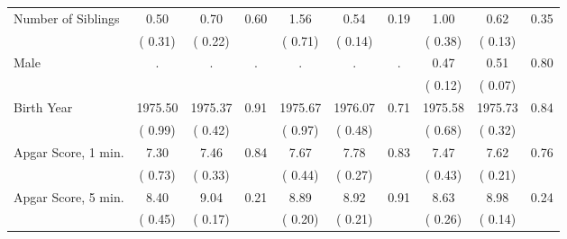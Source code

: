 \begin{tabular}{l c c c c c c c c c}
Number of Siblings &      0.50 &      0.70 &      0.60 &      1.56 &      0.54 &      0.19 &      1.00 &      0.62 &      0.35 \\
     & (     0.31) & (     0.22)  & & (     0.71) & (     0.14)  & & (     0.38) & (     0.13)  & \\
Male & . & . & . & . & . & . &      0.47 &      0.51 &      0.80 \\
&  & & & &  & & (     0.12) & (     0.07)  & \\
Birth Year &   1975.50 &   1975.37 &      0.91 &   1975.67 &   1976.07 &      0.71 &   1975.58 &   1975.73 &      0.84 \\
     & (     0.99) & (     0.42)  & & (     0.97) & (     0.48)  & & (     0.68) & (     0.32)  & \\
Apgar Score, 1 min. &      7.30 &      7.46 &      0.84 &      7.67 &      7.78 &      0.83 &      7.47 &      7.62 &      0.76 \\
     & (     0.73) & (     0.33)  & & (     0.44) & (     0.27)  & & (     0.43) & (     0.21)  & \\
Apgar Score, 5 min. &      8.40 &      9.04 &      0.21 &      8.89 &      8.92 &      0.91 &      8.63 &      8.98 &      0.24 \\
     & (     0.45) & (     0.17)  & & (     0.20) & (     0.21)  & & (     0.26) & (     0.14)  & \\
\bottomrule
\end{tabular}